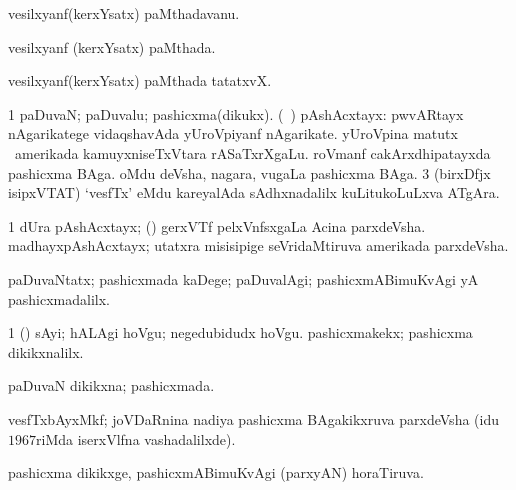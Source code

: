 {{{{{{\bentry
{} 
\gl{\nA}
\expl{}
\bmng
vesilxyanf(kerxYsatx) paMthadavanu. 
\emng
\eentry

\bentry
{} 
\gl{\gu}
\expl{}
 vesilxyanf (kerxYsatx) paMthada. 
\emng
\eentry

\bentry
{} 
\gl{\nA}
\expl{}
\bmng
vesilxyanf(kerxYsatx) paMthada tatatxvX. 
\emng
\eentry

\bentry
{} 
\gl{\nA}
\expl{}
\bmng
\bnum
\num{1} paDuvaN; paDuvalu; pashicxma(dikukx). 
 (\sA\ ) pAshAcxtayx: 
\banum
{} pwvARtayx nAgarikatege vidaqshavAda yUroVpiyanf nAgarikate. 
 yUroVpina matutx \kanu\ amerikada kamuyxniseTxVtara rASaTxrXgaLu. 
 roVmanf cakArxdhipatayxda pashicxma BAga. 
 oMdu deVsha, nagara, \mo vugaLa pashicxma BAga. 
\eanum
\numie
\num{3} (birxDfjx isipxVTAT) `vesfTx' eMdu kareyalAda sAdhxnadalilx kuLitukoLuLxva ATgAra. 
\enum
\emng

\noindent 
\gl{\pagu}
\expl{}
\bmng
\bnum
\num{1}  dUra pAshAcxtayx; (\ame) gerxVTf pelxVnfsxgaLa Acina parxdeVsha.  madhayxpAshAcxtayx; utatxra misisipige seVridaMtiruva amerikada parxdeVsha. 
\enum
\emng
\eentry

\bentry
{} 
\gl{\kirxvi}
\expl{}
\bmng
paDuvaNtatx; pashicxmada kaDege; paDuvalAgi; pashicxmABimuKvAgi yA pashicxmadalilx. 
\emng

\noindent 
\gl{\pagu}
\expl{}
\bmng
\bnum
\num{1}  (\ashi) sAyi; hALAgi hoVgu; negedubidudx hoVgu.  pashicxmakekx; pashicxma dikikxnalilx. 
\enum
\emng
\eentry

\bentry
{} 
\gl{\gu}
\expl{}
\bmng
paDuvaN dikikxna; pashicxmada. 
\emng
\eentry

\bentry
{} 
\gl{\kirxvi}
\expl{}
\bmng
{} 
\emng
\eentry

\bentry
{} 
\gl{\nA}
\expl{}
\bmng
vesfTxbAyxMkf; joVDaRnina nadiya pashicxma BAgakikxruva parxdeVsha (idu $1967$riMda iserxVlfna vashadalilxde). 
\emng
\eentry

\bentry
{} 
\gl{\gu}
\expl{}
\bmng
pashicxma dikikxge, pashicxmABimuKvAgi (parxyAN) horaTiruva. 
\emng
\eentry

}}}}}}
